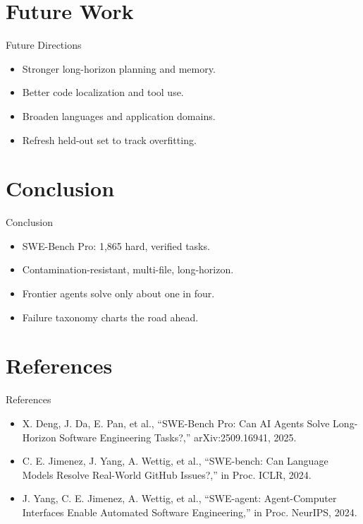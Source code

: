\documentclass{beamer}
\begin{document}
\section{Future Work}
\begin{frame}{Future Directions}
\begin{itemize}
\item Stronger long-horizon planning and memory.
\item Better code localization and tool use.
\item Broaden languages and application domains.
\item Refresh held-out set to track overfitting.
\end{itemize}
\end{frame}

\section{Conclusion}
\begin{frame}{Conclusion}
\begin{itemize}
\item SWE-Bench Pro: 1,865 hard, verified tasks.
\item Contamination-resistant, multi-file, long-horizon.
\item Frontier agents solve only about one in four.
\item Failure taxonomy charts the road ahead.
\end{itemize}
\end{frame}

\section{References}
\begin{frame}{References}
\footnotesize
\begin{itemize}
\item X. Deng, J. Da, E. Pan, et al., ``SWE-Bench Pro: Can AI Agents Solve Long-Horizon Software Engineering Tasks?,'' arXiv:2509.16941, 2025.
\item C. E. Jimenez, J. Yang, A. Wettig, et al., ``SWE-bench: Can Language Models Resolve Real-World GitHub Issues?,'' in Proc. ICLR, 2024.
\item J. Yang, C. E. Jimenez, A. Wettig, et al., ``SWE-agent: Agent-Computer Interfaces Enable Automated Software Engineering,'' in Proc. NeurIPS, 2024.
\end{itemize}
\end{frame}
\begin{frame}\vfill{}\vfill\end{frame}
\end{document}

